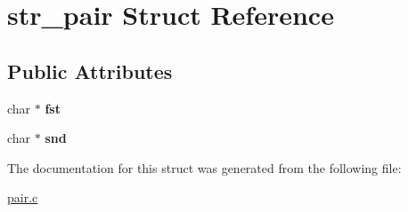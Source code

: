 \hypertarget{structstr__pair}{}\section{str\+\_\+pair Struct Reference}
\label{structstr__pair}
\subsection*{Public Attributes}
\begin{DoxyCompactItemize}
\item 
\mbox{\label{structstr__pair_a300d3bb83b7913be6bbe215a69e2e915}} 
char $\ast$ {\bfseries fst}
\item 
\mbox{\label{structstr__pair_aa1402d619cdb999b4a66c4dbbc08caf5}} 
char $\ast$ {\bfseries snd}
\end{DoxyCompactItemize}


The documentation for this struct was generated from the following file\+:\begin{DoxyCompactItemize}
\item 
\hyperlink{pair_8c}{pair.\+c}\end{DoxyCompactItemize}
